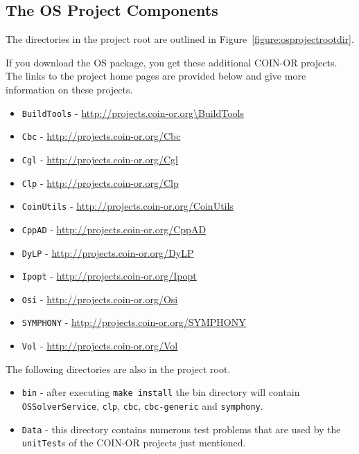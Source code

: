 \documentclass[11pt]{article}
\newcounter{Fig}
\renewcommand{\_}{{\char"5F}}
\renewcommand{\{}{{\char"7B}}
\renewcommand{\}}{{\char"7D}}
\renewcommand{\^}{{\char"0D}}
\renewcommand{\'}{{\char"0D}}
\begin{document}
\begin{enumerate}[Step 1:]
\section{The OS Project Components}\label{section:projectcomponents}

The directories in the  project root  are outlined in Figure~\ref{figure:osprojectrootdir}.

If you download the OS package, you get these additional COIN-OR projects. The links to the project home pages are provided below and give more information on these projects.
\begin{itemize}
\item {\tt BuildTools} - \url{http://projects.coin-or.org\BuildTools}
\item {\tt Cbc} - \url{http://projects.coin-or.org/Cbc}
\item {\tt Cgl} - \url{http://projects.coin-or.org/Cgl}
\item {\tt Clp} - \url{http://projects.coin-or.org/Clp}
\item {\tt CoinUtils} - \url{http://projects.coin-or.org/CoinUtils}
\item {\tt CppAD} - \url{http://projects.coin-or.org/CppAD}
\item {\tt DyLP}  - \url{http://projects.coin-or.org/DyLP}
\item {\tt Ipopt} - \url{http://projects.coin-or.org/Ipopt}
\item {\tt Osi} - \url{http://projects.coin-or.org/Osi}
\item {\tt SYMPHONY}   - \url{http://projects.coin-or.org/SYMPHONY}
\item {\tt Vol} - \url{http://projects.coin-or.org/Vol}
\end{itemize}

The following directories are also in the project root.
\begin{itemize}
\item {\tt bin} - after executing {\tt make install} the bin directory will contain {\tt OSSolverService}, {\tt clp}, {\tt cbc},  {\tt cbc-generic} and {\tt symphony}.

\item {\tt Data} - this directory contains numerous test problems that are used by the {\tt unitTest}s of
the COIN-OR projects just mentioned.


\end{itemize}
\end{enumerate}
\end{document}
